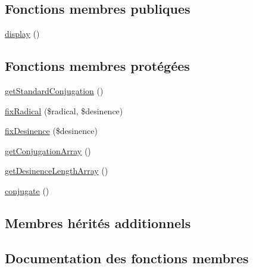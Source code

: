 \subsection*{Fonctions membres publiques}
\begin{DoxyCompactItemize}
\item 
\hyperlink{class_conjugation_provencal_first_group_a6bd7d4bb8434586bf0ac5836a51d0022}{display} ()
\end{DoxyCompactItemize}
\subsection*{Fonctions membres protégées}
\begin{DoxyCompactItemize}
\item 
\hyperlink{class_conjugation_provencal_first_group_aedd116ac330b4c069c860612d624badc}{get\+Standard\+Conjugation} ()
\item 
\hyperlink{class_conjugation_provencal_first_group_a58519c759619a7566d20de71b6c93dc6}{fix\+Radical} (\$radical, \$desinence)
\item 
\hyperlink{class_conjugation_provencal_first_group_a65b702345db86895aecf34b88f0134a7}{fix\+Desinence} (\$desinence)
\item 
\hyperlink{class_conjugation_provencal_first_group_a65f47dc174389bc9b680cef0a3e622a2}{get\+Conjugation\+Array} ()
\item 
\hyperlink{class_conjugation_provencal_first_group_a26ccc767ad4308637e382b4dd653f43a}{get\+Desinence\+Length\+Array} ()
\item 
\hyperlink{class_conjugation_provencal_first_group_ad06866f3c378d109a3e56ff8a69d660a}{conjugate} ()
\end{DoxyCompactItemize}
\subsection*{Membres hérités additionnels}


\subsection{Documentation des fonctions membres}
\hypertarget{class_conjugation_provencal_first_group_ad06866f3c378d109a3e56ff8a69d660a}{}\label{class_conjugation_provencal_first_group_ad06866f3c378d109a3e56ff8a69d660a} 
